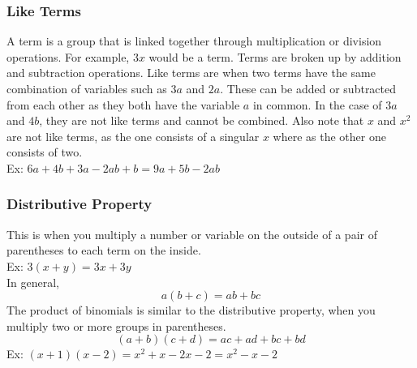 \documentclass[11pt, fleqn]{article}
\begin{document}
\subsubsection{Like Terms}
A term is a group that is linked together through multiplication or division operations. For example, $3x$ would be a term. Terms are broken up by addition and subtraction operations. Like terms are when two terms have the same combination of variables such as $3a$ and $2a$. These can be added or subtracted from each other as they both have the variable $a$ in common. In the case of $3a$ and $4b$, they are not like terms and cannot be combined. Also note that $x$ and $x^2$ are not like terms, as the one consists of a singular $x$ where as the other one consists of two.\\
Ex: $6a+4b+3a-2ab+b=9a+5b-2ab$

\subsubsection{Distributive Property}
This is when you multiply a number or variable on the outside of a pair of parentheses to each term on the inside.\\
Ex: $3(x+y)=3x+3y$\\
In general,
$$a(b+c)=ab+bc$$
The product of binomials is similar to the distributive property, when you multiply two or more groups in parentheses.
$$(a+b)(c+d)=ac+ad+bc+bd$$
Ex: $(x+1)(x-2)=x^2+x-2x-2=x^2-x-2$
\end{document}
